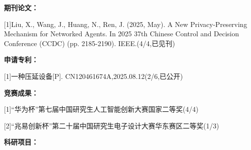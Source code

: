 \documentclass[promaster]{hdu-thesis}
\begin{document}
 \personalresult

{\par\bfseries \noindent 期刊论文：}

[1]Liu, X., Wang, J., Huang, N., Ren, J. (2025, May). A New Privacy-Preserving Mechanism for Networked Agents. In 2025 37th Chinese Control and Decision Conference (CCDC) (pp. 2185-2190). IEEE.(4/4,已见刊)


\par\bfseries \noindent 申请专利：

[1]一种压延设备[P]. CN120461674A,2025.08.12(2/6,已公开)

{\par\bfseries \noindent 竞赛成果：}

[1]“华为杯”第七届中国研究生人工智能创新大赛国家二等奖(4/4)

[2]“兆易创新杯”第二十届中国研究生电子设计大赛华东赛区二等奖(1/3)
{\par\bfseries \noindent 科研项目：}





\end{document}
